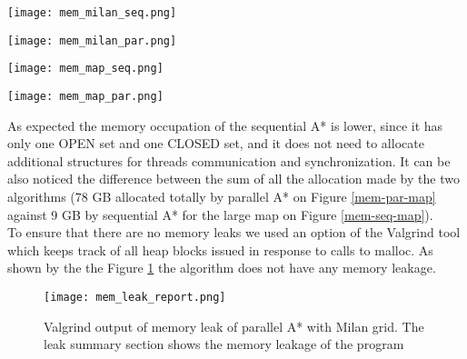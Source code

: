 \begin{center}
    \begin{minipage}[b]{0.45\textwidth}
        \texttt{[image: mem\_milan\_seq.png]}
        \label{mem-seq-milan}
    \end{minipage}
    \hspace{0.5cm}
    \begin{minipage}[b]{0.45\textwidth}
        \texttt{[image: mem\_milan\_par.png]}
        \label{mem-par-milan}
    \end{minipage}%
    
    \vspace{0.5cm}
    
    \begin{minipage}[b]{0.45\textwidth}
        \texttt{[image: mem\_map\_seq.png]}
        \label{mem-seq-map}
    \end{minipage}%
    \hspace{0.5cm}
    \begin{minipage}[b]{0.45\textwidth}
        \texttt{[image: mem\_map\_par.png]}
        \label{mem-par-map}
    \end{minipage}

\end{center}

\vspace{0.5cm}

As expected the memory occupation of the sequential A* is lower, since it has only one OPEN set and one CLOSED set, and it does not need to allocate additional structures for threads communication and synchronization.
It can be also noticed the difference between the sum of all the allocation made by the two algorithms (78 GB allocated totally by parallel A* on Figure \ref{mem-par-map} against 9 GB by sequential A* for the large map on Figure \ref{mem-seq-map}).
\\
To ensure that there are no memory leaks we used an option of the Valgrind tool which keeps track of all heap blocks issued in response to calls to malloc.
As shown by the the Figure \ref{mem-leak-milan} the algorithm does not have any memory leakage.

\begin{figure}[h]
    \centering
    \texttt{[image: mem\_leak\_report.png]}
    \caption{Valgrind output of memory leak of parallel A* with Milan grid. The leak summary section shows the memory leakage of the program}
    \label{mem-leak-milan}
\end{figure}


